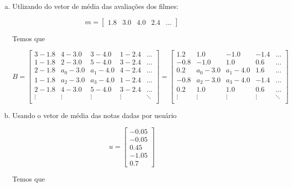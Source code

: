 \documentclass[11pt]{article}
\begin{document}
\begin{exerc}
\begin{enumerate}[a.]
.

\item
Utlizando do vetor de média das avaliações dos filmes:

\[
m =
\begin{bmatrix}
     1.8 & 3.0 & 4.0 & 2.4 & \dots
\end{bmatrix}
\]

Temos que

\[
B = 
\begin{bmatrix}
    3 - 1.8 & 4 - 3.0 & 3 - 4.0 & 1 - 2.4 & \dots \\
    1 - 1.8 & 2 - 3.0 & 5 - 4.0 & 3 - 2.4 & \dots \\
    2 - 1.8 & a_0 - 3.0 & a_1 - 4.0 & 4 - 2.4 & \dots \\
    1 - 1.8 & a_2 - 3.0 & a_3 - 4.0 & 1 - 2.4 & \dots \\
    2 - 1.8 & 4 - 3.0 & 5 - 4.0 & 3 - 2.4 & \dots \\
    \vdots & \vdots & \vdots & \vdots & \ddots \\
\end{bmatrix}
=
\begin{bmatrix}
    1.2 & 1.0 & -1.0 & -1.4 & \dots \\
    -0.8 & -1.0 & 1.0 & 0.6 & \dots \\
    0.2 & a_0 - 3.0 & a_1 - 4.0 & 1.6 & \dots \\
    -0.8 & a_2 - 3.0 & a_3 - 4.0 & -1.4 & \dots \\
    0.2 & 1.0 & 1.0 & 0.6 & \dots \\
    \vdots & \vdots & \vdots & \vdots & \ddots \\
\end{bmatrix}
\]

\item
Usando o vetor de média das notas dadas por usuário

\[
u =
\begin{bmatrix}
     -0.05 \\
     -0.05 \\
     0.45 \\
     -1.05 \\
     0.7
\end{bmatrix}
\]

Temos que


\end{enumerate}
\end{exerc}
\end{document}
